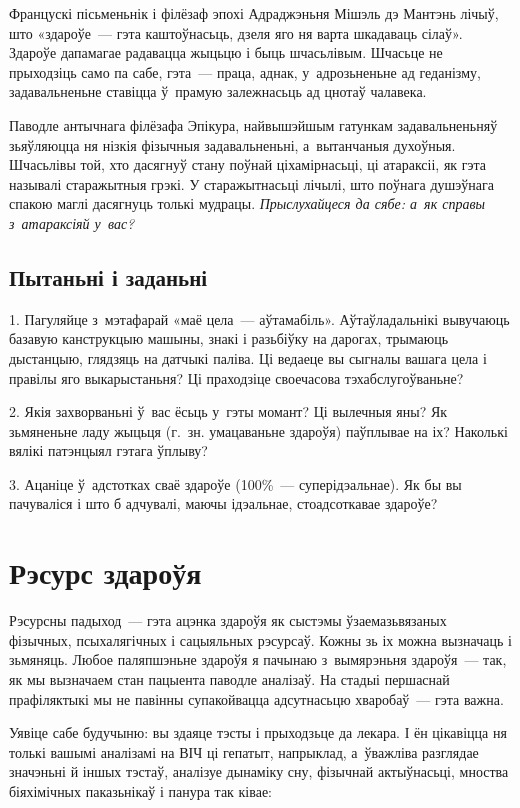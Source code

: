 Францускі пісьменьнік і філёзаф эпохі Адраджэньня Мішэль дэ Мантэнь лічыў, што «здароўе~--- гэта каштоўнасьць, дзеля яго ня варта шкадаваць сілаў». Здароўе дапамагае радавацца жыцьцю і быць шчасьлівым. Шчасьце не прыходзіць само па сабе, гэта~--- праца, аднак, у~адрозьненьне ад геданізму, задавальненьне ставіцца ў~прамую залежнасьць ад цнотаў чалавека.

Паводле антычнага філёзафа Эпікура, найвышэйшым гатункам задавальненьняў зьяўляюцца ня нізкія фізычныя задавальненьні, а~вытанчаныя духоўныя. Шчасьлівы той, хто дасягнуў стану поўнай ціхамірнасьці, ці атараксіі, як гэта называлі старажытныя грэкі. У старажытнасьці лічылі, што поўнага душэўнага спакою маглі дасягнуць толькі мудрацы. \emph{Прыслухайцеся да сябе: а~як справы з~атараксіяй у~вас?}

\subsection*{Пытаньні і заданьні}

1. Пагуляйце з~мэтафарай «маё цела~--- аўтамабіль». Аўтаўладальнікі вывучаюць базавую канструкцыю машыны, знакі і разьбіўку на дарогах, трымаюць дыстанцыю, глядзяць на датчыкі паліва. Ці ведаеце вы сыгналы вашага цела і правілы яго выкарыстаньня? Ці праходзіце своечасова тэхабслугоўваньне?

2. Якія захворваньні ў~вас ёсьць у~гэты момант? Ці вылечныя яны? Як зьмяненьне ладу жыцьця (г.~зн. умацаваньне здароўя) паўплывае на іх? Наколькі вялікі патэнцыял гэтага ўплыву?

3. Ацаніце ў~адстотках сваё здароўе (100\%~--- суперідэальнае). Як бы вы пачуваліся і што б адчувалі, маючы ідэальнае, стоадсоткавае здароўе?


\section{Рэсурс здароўя}

Рэсурсны падыход~--- гэта ацэнка здароўя як сыстэмы ўзаемазьвязаных фізычных, псыхалягічных і сацыяльных рэсурсаў. Кожны зь іх можна вызначаць і зьмяняць. Любое паляпшэньне здароўя я пачынаю з~вымярэньня здароўя~--- так, як мы вызначаем стан пацыента паводле аналізаў. На стадыі першаснай прафіляктыкі мы не павінны супакойвацца адсутнасьцю хваробаў~--- гэта важна.

Уявіце сабе будучыню: вы здаяце тэсты і прыходзьце да лекара. І ён цікавіцца ня толькі вашымі аналізамі на ВІЧ ці гепатыт, напрыклад, а~ўважліва разглядае значэньні й іншых тэстаў, аналізуе дынаміку сну, фізычнай актыўнасьці, мноства біяхімічных паказьнікаў і панура так ківае:

